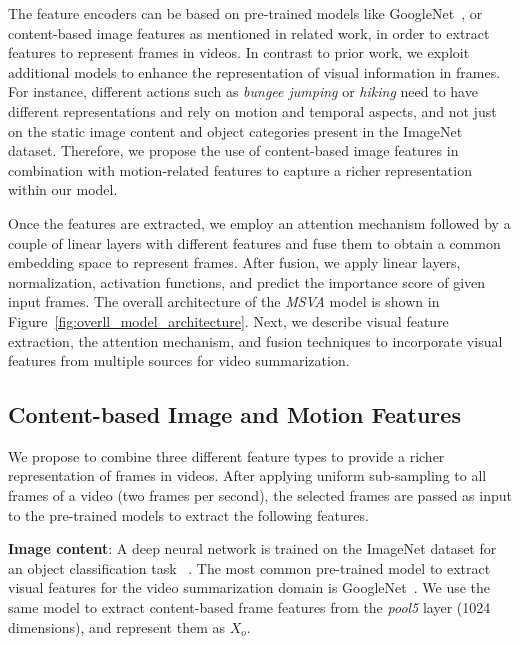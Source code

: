 \documentclass{article}
\begin{document}
The feature encoders can be based on pre-trained models like GoogleNet~\cite{DBLP:conf/cvpr/SzegedyLJSRAEVR15}, or content-based image features as mentioned in related work, in order to extract features to represent frames in videos. In contrast to prior work, we exploit additional models to enhance the representation of visual information in frames. For instance, different actions such as \textit{bungee jumping} or \textit{hiking} need to have different representations and rely on motion and temporal aspects, and not just on the static image content and object categories present in the ImageNet dataset. Therefore, we propose the use of content-based image features in combination with motion-related features to capture a richer representation within our model.

Once the features are extracted, we employ an attention mechanism followed by a couple of linear layers with different features and fuse them to obtain a common embedding space to represent frames. After fusion, we apply linear layers, normalization, activation functions, and predict the importance score of given input frames. The overall architecture of the \textit{MSVA} model is shown in Figure~\ref{fig:overll_model_architecture}. Next, we describe visual feature extraction, the attention mechanism, and fusion techniques to incorporate visual features from multiple sources for video summarization.

\subsection{Content-based Image and Motion Features}

																																																																																																																			  
We propose to combine three different feature types to provide a richer representation of frames in videos. After applying uniform sub-sampling to all frames of a video (two frames per second), the selected frames are passed as input to the pre-trained models to extract the following features.

\noindent
\textbf{Image content}: A deep neural network is trained on the ImageNet dataset for an object classification task ~\cite{DBLP:conf/cvpr/SzegedyLJSRAEVR15}. The most common pre-trained model to extract visual features for the video summarization domain is GoogleNet~\cite{DBLP:conf/cvpr/SzegedyLJSRAEVR15}. We use the same model to extract content-based frame features from the \textit{pool5} layer (\num{1024} dimensions), and represent them as $X_o$.
\end{document}
